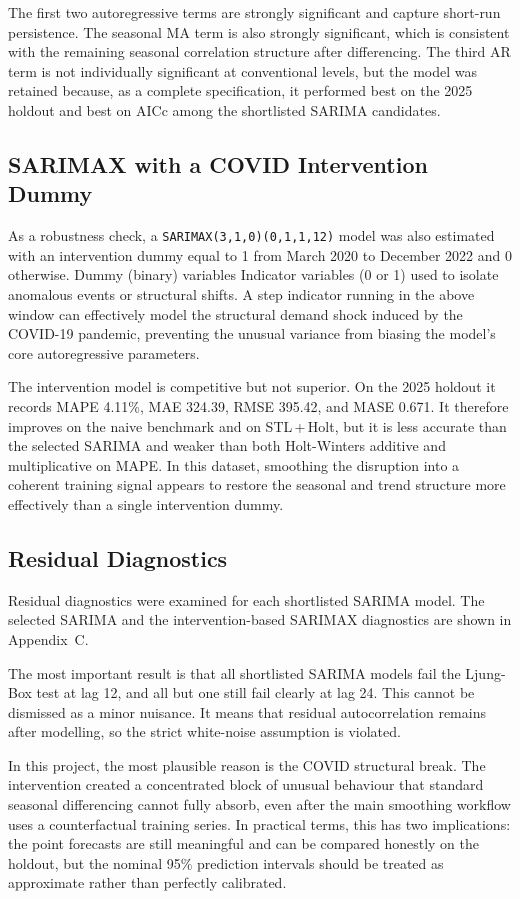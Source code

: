 \documentclass[runningheads]{llncs}
\begin{document}
The first two autoregressive terms are strongly significant and capture short-run persistence. The seasonal MA term is also strongly significant, which is consistent with the remaining seasonal correlation structure after differencing. The third AR term is not individually significant at conventional levels, but the model was retained because, as a complete specification, it performed best on the 2025 holdout and best on AICc among the shortlisted SARIMA candidates.

\subsection{SARIMAX with a COVID Intervention Dummy}
As a robustness check, a \texttt{SARIMAX(3,1,0)(0,1,1,12)} model was also estimated with an intervention dummy equal to 1 from March 2020 to December 2022 and 0 otherwise. Dummy (binary) variables Indicator variables (0 or 1) used to isolate anomalous events or structural shifts. A step indicator running in the above window can effectively model the structural demand shock induced by the COVID-19 pandemic, preventing the unusual variance from biasing the model's core autoregressive parameters.

The intervention model is competitive but not superior. On the 2025 holdout it records MAPE 4.11\%, MAE 324.39, RMSE 395.42, and MASE 0.671. It therefore improves on the naive benchmark and on STL\,+\,Holt, but it is less accurate than the selected SARIMA and weaker than both Holt-Winters additive and multiplicative on MAPE. In this dataset, smoothing the disruption into a coherent training signal appears to restore the seasonal and trend structure more effectively than a single intervention dummy.

\subsection{Residual Diagnostics}
Residual diagnostics were examined for each shortlisted SARIMA model. The selected SARIMA and the intervention-based SARIMAX diagnostics are shown in Appendix~C.

The most important result is that all shortlisted SARIMA models fail the Ljung-Box test at lag 12, and all but one still fail clearly at lag 24. This cannot be dismissed as a minor nuisance. It means that residual autocorrelation remains after modelling, so the strict white-noise assumption is violated.

In this project, the most plausible reason is the COVID structural break. The intervention created a concentrated block of unusual behaviour that standard seasonal differencing cannot fully absorb, even after the main smoothing workflow uses a counterfactual training series. In practical terms, this has two implications: the point forecasts are still meaningful and can be compared honestly on the holdout, but the nominal 95\% prediction intervals should be treated as approximate rather than perfectly calibrated.
\end{document}
